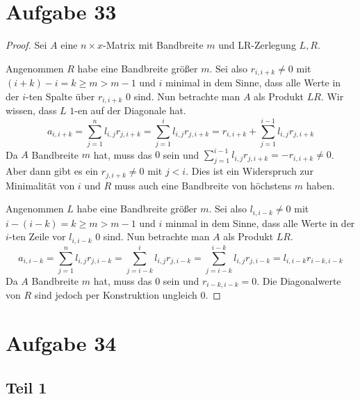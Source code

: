 \documentclass[10pt,a4paper]{article}
\begin{document}
\section{Aufgabe 33}

\begin{proof}
  Sei $A$ eine $n \times x$-Matrix mit Bandbreite $m$ und LR-Zerlegung $L, R$.

  Angenommen $R$ habe eine Bandbreite größer $m$.
  Sei also $r_{i,i + k} \ne 0$ mit $(i + k) - i = k \ge m > m - 1$ und $i$ minimal in dem Sinne, dass alle Werte in der $i$-ten Spalte über $r_{i, i + k}$ $0$ sind.
  Nun betrachte man $A$ als Produkt $LR$.
  Wir wissen, dass $L$ $1$-en auf der Diagonale hat.
  \begin{equation}
    a_{i, i + k} = \sum_{j = 1}^{n} l_{i, j} r_{j, i + k} = \sum_{j = 1}^{i} l_{i, j} r_{j, i + k} = r_{i, i + k} + \sum_{j = 1}^{i - 1} l_{i, j} r_{j, i + k}
  \end{equation}
  Da $A$ Bandbreite $m$ hat, muss das $0$ sein und $\sum_{j = 1}^{i - 1} l_{i, j} r_{j, i + k} = -r_{i, i + k} \ne 0$.
  Aber dann gibt es ein $r_{j, i + k} \ne 0$ mit $j < i$.
  Dies ist ein Widerspruch zur Minimalität von $i$ und $R$ muss auch eine Bandbreite von höchstens $m$ haben.

  Angenommen $L$ habe eine Bandbreite größer $m$.
  Sei also $l_{i, i - k} \ne 0$ mit $i - (i - k) = k \ge m > m - 1$ und $i$ minmal in dem Sinne, dass alle Werte in der $i$-ten Zeile vor $l_{i, i - k}$ $0$ sind.
  Nun betrachte man $A$ als Produkt $LR$.
  \begin{equation}
    a_{i, i - k} = \sum_{j = 1}^{n} l_{i, j} r_{j, i - k} = \sum_{j = i - k}^{i} l_{i, j} r_{j, i - k} = \sum_{j = i - k}^{i - k} l_{i, j} r_{j, i - k} = l_{i, i - k} r_{i - k, i - k}
  \end{equation}
  Da $A$ Bandbreite $m$ hat, muss das $0$ sein und $r_{i - k, i - k} = 0$.
  Die Diagonalwerte von $R$ sind jedoch per Konstruktion ungleich $0$.
\end{proof}

\section{Aufgabe 34}

\subsection{Teil 1}
\end{document}
